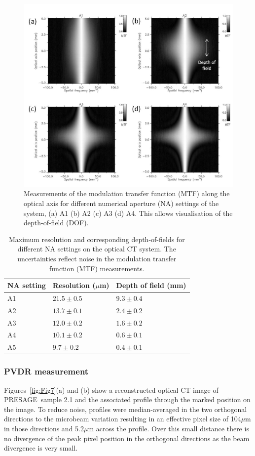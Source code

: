 \documentclass[12pt]{article}
\begin{document}
\begin{figure}
\centering
\includegraphics[width=0.9\linewidth]{Fig6}
\caption{Measurements of the modulation transfer function (MTF) along the optical axis for different numerical aperture (NA) settings of the system, (a) A1 (b) A2 (c) A3 (d) A4. This allows visualisation of the depth-of-field (DOF).}
\label{fig:Fig6}
\end{figure}

\begin{table}[H]
	\centering
	\begin{tabular}{ p{2.5cm}  p{3.5cm} p{4.5cm}  }
		\hline
		\textbf{NA setting} & \textbf{Resolution ($\mu$m)} &\textbf{Depth of field (mm)}  \\ \hline
		A1  & $21.5 \pm 0.5$ & $9.3 \pm 0.4$ \\ %
		A2  & $13.7 \pm 0.1$ & $2.4 \pm 0.2$ \\ %
		A3  & $12.0 \pm 0.2$ & $1.6 \pm 0.2$ \\ %
		A4  & $10.1 \pm 0.2$ & $0.6 \pm 0.1$ \\ %
		A5  & $9.7 \pm 0.2$ & $0.4 \pm 0.1$ \\ \hline		
	\end{tabular}
	\caption{Maximum resolution and corresponding depth-of-fields for different NA settings on the optical CT system. The uncertainties reflect noise in the modulation transfer function (MTF)  measurements.}
	\label{table:DOFNA}
\end{table}


\subsubsection{PVDR measurement} 
Figures~\ref{fig:Fig7}(a) and (b) show a reconstructed optical CT image of PRESAGE\textregistered \ sample 2.1 and the associated profile through the marked position on the image. To reduce noise, profiles were median-averaged in the two orthogonal directions to the microbeam variation resulting in an effective pixel size of 104$\mu$m in those directions and 5.2$\mu$m across the profile. Over this small distance there is no divergence of the peak pixel position in the orthogonal directions as the beam divergence is very small. 
\end{document}

